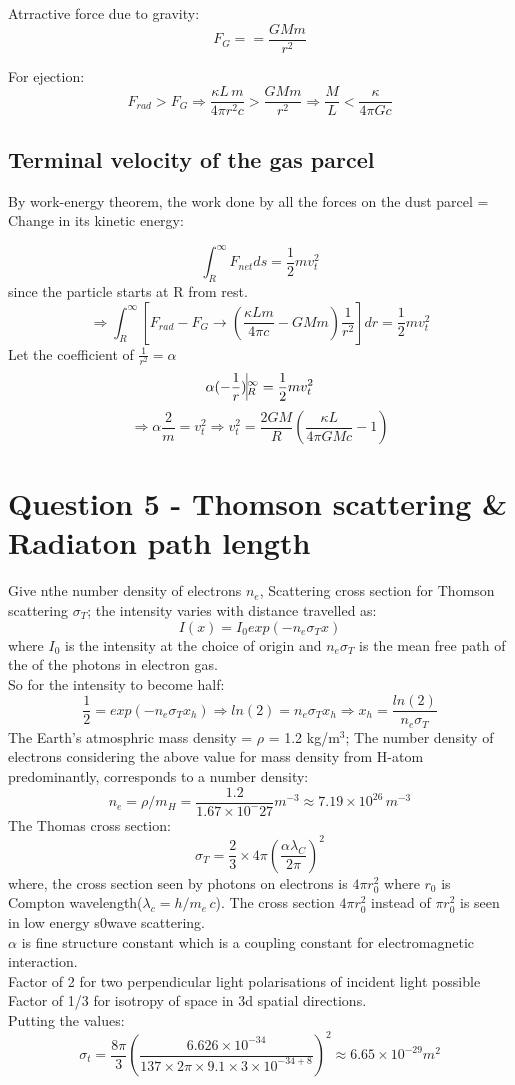 \documentclass[11pt]{article}
\begin{document}
		Atrractive force due to gravity:
		\[
			F_G = = \frac{GMm}{r^2}
		\]
		
		For ejection:
		\[
			F_{rad}>F_G \Rightarrow \frac{\kappa L \, m}{4 \pi r^2 c} > \frac{GMm}{r^2} \Rightarrow \boxed{\frac{M}{L}< \frac{\kappa}{4\pi G c}}
		\]
		
		\subsection{Terminal velocity of the gas parcel}
		
		By work-energy theorem, the work done by all the forces on the dust parcel = Change in its kinetic energy:
		
		\[
			\int_R^{\infty} F_{net} ds = \frac{1}{2} m v_t^2
		\]
		since the particle starts at R from rest.
		\[
			\Rightarrow \int_R^{\infty} [F_{rad} - F_G \rightarrow (\frac{\kappa L m}{4\pi c} - G M m)\frac{1}{r^2}]  dr  = \frac{1}{2} m v_t^2
		\]
		Let the coefficient of $\frac{1}{r^2} = \alpha$
		\[
			\alpha (-\frac{1}{r})\vline_R^{\infty} = \frac{1}{2}mv_t^2
		\]
		\[
			\Rightarrow \alpha \frac{2}{m} = v_t^2 \Rightarrow \boxed{v_t^2 = \frac{2GM}{R}(\frac{\kappa L}{4\pi G M c} -1)}
		\]
		
		\section{\color{teal} Question 5 - Thomson scattering \& Radiaton path length}
		
		Give nthe number density of electrons $n_e$, Scattering cross section for Thomson scattering $\sigma_T$; the intensity varies with distance travelled as:
		\[
			I(x) = I_0 exp(-n_e \sigma_T x)
		\]
		where $I_0$ is the intensity at the choice of origin and 
		$n_e \sigma_T$ is the mean free path of the of the photons in electron gas.\\
		So for the intensity to become half:
		\[
			\frac{1}{2} = exp(-n_e \sigma_T x_h) \Rightarrow ln(2) = n_e \sigma_T x_h \Rightarrow x_h = \frac{ln(2)}{n_e \sigma_T}
		\]
		The Earth's atmosphric mass density = $\rho$ = 1.2 kg/m$^3$;
		The number density of electrons considering the above value for mass density from H-atom predominantly, corresponds to a number density:
		\[
			n_e  = \rho/m_H = \frac{1.2}{1.67 \times 10^-{27}} m^{-3} \approx 7.19 \times 10^{26} \, m^{-3}
		\]
		The Thomas cross section:
		\[
			\sigma_T = \frac{2}{3} \times 4\pi (\frac{\alpha \lambda_C}{2 \pi})^2
		\]
		where, the cross section seen by photons on electrons is $4 \pi r_0^2$ where $r_0$ is Compton wavelength($\lambda_c = h/m_e \,c$). The cross section $4 \pi r_0^2$ instead of $\pi r_0^2$ is seen in low energy s0wave scattering.\\
		$\alpha$ is fine structure constant which is a coupling constant for electromagnetic interaction.\\
		Factor of 2 for two perpendicular light polarisations of incident light possible\\
		Factor of 1/3 for isotropy of space in 3d spatial directions.\\
		Putting the values:
		\[
			\sigma_t = \frac{8\pi}{3} (\frac{6.626 \times 10^{-34}}{137 \times 2\pi \times 9.1 \times 3 \times 10^{-34+8}})^2 \approx 6.65 \times 10^{-29} m^2
		\]
		
\end{document}
